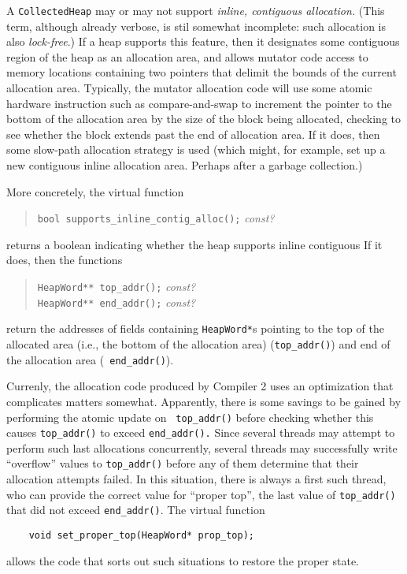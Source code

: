 \documentclass{article}
\begin{document}
A {\tt CollectedHeap} may or may not support {\em inline, contiguous
allocation.}  (This term, although already verbose, is stil somewhat
incomplete: such allocation is also {\em lock-free}.)  If a heap
supports this feature, then it designates some contiguous region of
the heap as an allocation area, and allows mutator code access to
memory locations containing two pointers that delimit the bounds of
the current allocation area.  Typically, the mutator allocation code
will use some atomic hardware instruction such as compare-and-swap to
increment the pointer to the bottom of the allocation area by the size
of the block being allocated, checking to see whether the block
extends past the end of allocation area.  If it does, then some
slow-path allocation strategy is used (which might, for example, set
up a new contiguous inline allocation area.  Perhaps after a garbage
collection.)

More concretely, the virtual function
\begin{quote}
    {\tt bool supports\_inline\_contig\_alloc();}  {\em const?}
\end{quote}
returns a boolean indicating whether the heap supports inline contiguous
If it does, then the functions
\begin{quote}
    {\tt HeapWord** top\_addr();}  {\em const?} \\
    {\tt HeapWord** end\_addr();}  {\em const?}
\end{quote}
return the addresses of fields containing {\tt HeapWord*}s pointing to
the top of the allocated area (i.e., the bottom of the allocation
area) ({\tt top\_addr()}) and end of the allocation area ({\tt
end\_addr()}).

Currenly, the allocation code produced by Compiler 2 uses an
optimization that complicates matters somewhat.  Apparently, there is
some savings to be gained by performing the atomic update on {\tt
top\_addr()} before checking whether this causes {\tt *top\_addr()} to
exceed {\tt *end\_addr().}  Since several threads may attempt to perform
such last allocations concurrently, several threads may successfully
write ``overflow'' values to {\tt top\_addr()} before any of them
determine that their allocation attempts failed.  In this situation,
there is always a first such thread, who can provide the correct value
for ``proper top'', the last value of {\tt *top\_addr()} that did not
exceed {\tt *end\_addr()}.  The virtual function
\begin{verbatim}
    void set_proper_top(HeapWord* prop_top);
\end{verbatim}
allows the code that sorts out such situations to restore the proper
state.
\end{document}
